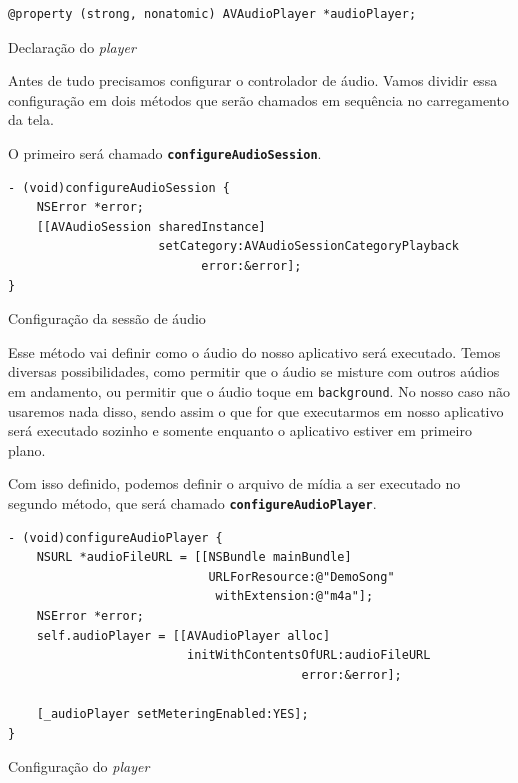 \documentclass[a4paper,12pt,brazil,doubleside]{book}
\begin{document}
\begin{singlespace}
\begin{listing}[H]
\begin{verbatim}
@property (strong, nonatomic) AVAudioPlayer *audioPlayer;
\end{verbatim}
\caption{Declaração do \emph{player}}
\end{listing}


Antes de tudo precisamos configurar o controlador de áudio. Vamos dividir essa configuração em dois métodos que serão chamados em sequência no carregamento da tela.

O primeiro será chamado \texttt{\textbf{configureAudioSession}}.

\begin{listing}[H]
\begin{verbatim}
- (void)configureAudioSession {
    NSError *error;
    [[AVAudioSession sharedInstance]
                     setCategory:AVAudioSessionCategoryPlayback
                           error:&error];
}
\end{verbatim}
\caption{Configuração da sessão de áudio}
\end{listing}


Esse método vai definir como o áudio do nosso aplicativo será executado. Temos diversas possibilidades, como permitir que o áudio se misture com outros aúdios em andamento, ou permitir que o áudio toque em \texttt{background}. No nosso caso não usaremos nada disso, sendo assim o que for que executarmos em nosso aplicativo será executado sozinho e somente enquanto o aplicativo estiver em primeiro plano.

Com isso definido, podemos definir o arquivo de mídia a ser executado no segundo método, que será chamado \texttt{\textbf{configureAudioPlayer}}.

\begin{listing}[H]
\begin{verbatim}
- (void)configureAudioPlayer {
    NSURL *audioFileURL = [[NSBundle mainBundle]
                            URLForResource:@"DemoSong"
                             withExtension:@"m4a"];
    NSError *error;
    self.audioPlayer = [[AVAudioPlayer alloc]
                         initWithContentsOfURL:audioFileURL
                                         error:&error];
    
    [_audioPlayer setMeteringEnabled:YES];
}
\end{verbatim}
\caption{Configuração do \emph{player}}
\end{listing}



\end{singlespace}
\end{document}
